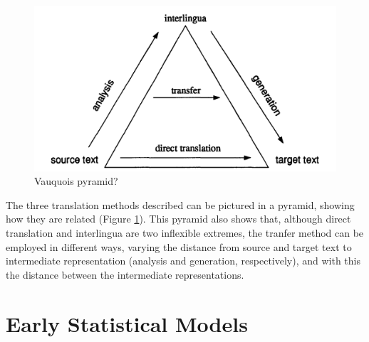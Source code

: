\documentclass{report}
\theoremstyle{definition}
\theoremstyle{plain}
\begin{document}
\begin{figure}[!ht]
\includegraphics[scale=0.2]{translation_triangle.png}
\caption{Vauquois pyramid?}\label{fig:triangle}
\end{figure}

The three translation methods described can be pictured in a pyramid, showing how they are related (Figure \ref{fig:triangle}). This pyramid also shows that, although direct translation and interlingua are two inflexible extremes, the tranfer method can be employed in different ways, varying the distance from source and target text to intermediate representation (analysis and generation, respectively), and with this the distance between the intermediate representations.

\section{Early Statistical Models}
\end{document}
